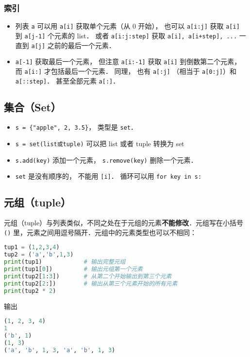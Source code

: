 \subsubsection{索引}
\begin{itemize}
\item 列表 \verb|a| 可以用 \verb|a[i]| 获取单个元素（从 0 开始）， 也可以 \verb|a[i:j]| 获取 \verb|a[i]| 到 \verb|a[j-1]| 个元素的 list． 或者 \verb|a[i:j:step]| 获取 \verb|a[i], a[i+step], ...| 一直到 \verb|a[j]| 之前的最后一个元素． 
\item \verb|a[-1]| 获取最后一个元素， 但注意 \verb|a[i:-1]| 获取 \verb|a[i]| 到倒数第二个元素， 而 \verb|a[i:]| 才包括最后一个元素． 同理， 也有 \verb|a[:j]| （相当于 \verb|a[0:j]|）和 \verb|a[::step]|． 甚至全部元素 \verb|a[:]|．
\end{itemize}


\subsection{集合（Set）}
\begin{itemize}
\item \verb|s = {"apple", 2, 3.5}|， 类型是 \verb|set|． 
\item \verb|s = set(list或tuple)| 可以把 list 或者 tuple 转换为 set
\item \verb|s.add(key)| 添加一个元素， \verb|s.remove(key)| 删除一个元素．
\item \verb|set| 是没有顺序的， 不能用 \verb|[i]|． 循环可以用 \verb|for key in s:|
\end{itemize}


\subsection{元组（tuple）}
元组（tuple）与列表类似，不同之处在于元组的元素\textbf{不能修改}．元组写在小括号 \verb|()| 里，元素之间用逗号隔开．元组中的元素类型也可以不相同：
\begin{lstlisting}[language=python]
tup1 = (1,2,3,4)
tup2 = ('a','b',1,3)
print(tup1)            # 输出完整元组
print(tup1[0])         # 输出元组第一个元素
print(tup2[1:3])       # 从第二个开始输出到第三个元素
print(tup2[2:])        # 输出从第三个元素开始的所有元素
print(tup2 * 2)
\end{lstlisting}
输出
\begin{lstlisting}[language=python]
(1, 2, 3, 4)
1
('b', 1)
(1, 3)
('a', 'b', 1, 3, 'a', 'b', 1, 3)
\end{lstlisting}

